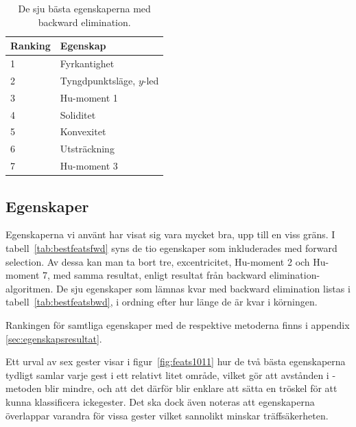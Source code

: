 \documentclass[../rapport_MVEX01-11-05]{subfiles}
\begin{document}
\begin{table}[tb]
	\centering
    \caption{De sju bästa egenskaperna med backward elimination.}
	
	\label{tab:bestfeatsbwd}
	\begin{tabular}{ll}
		\toprule
		Ranking & Egenskap \\
		\midrule
                1 & Fyrkantighet \\
                2 & Tyngdpunktsläge, $y$-led \\
                3 & Hu-moment 1\\
                4 & Soliditet\\
                5 & Konvexitet \\
                6 & Utsträckning \\
                7 & Hu-moment 3 \\
		\bottomrule
	\end{tabular}
\end{table}

\subsection{Egenskaper}\label{sec:resultat_features}

Egenskaperna vi använt har visat sig vara mycket bra, upp till en viss gräns.
I tabell~\vref{tab:bestfeatsfwd} syns de tio egenskaper som inkluderades
med forward selection. Av dessa kan man ta bort tre, excentricitet,
Hu-moment 2 och Hu-moment 7,
med samma resultat, enligt resultat från backward
elimination-algoritmen. De sju egenskaper som lämnas kvar med
backward elimination listas i tabell~\vref{tab:bestfeatsbwd}, i
ordning efter hur länge de är kvar i körningen.

Rankingen för samtliga egenskaper med de respektive metoderna finns i appendix
\ref{sec:egenskapsresultat}.

Ett urval av sex gester visar i
figur~\vref{fig:feats1011} hur de två bästa egenskaperna tydligt samlar varje
gest i ett relativt litet område, vilket gör att avstånden i \knn-metoden 
blir mindre, och att det därför blir enklare att sätta en tröskel för att
kunna klassificera ickegester. Det ska dock även noteras att egenskaperna 
överlappar varandra för vissa gester vilket sannolikt minskar träffsäkerheten.
\end{document}
